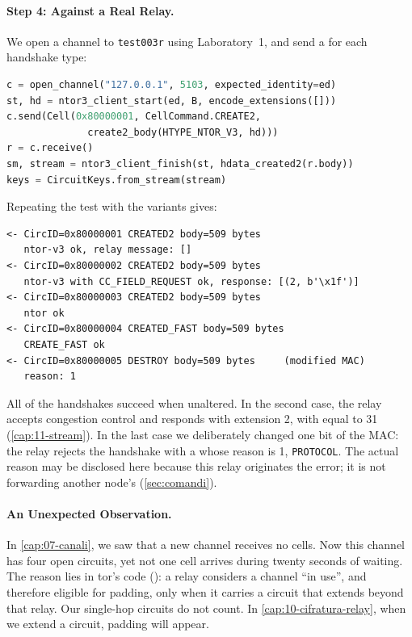 \paragraph{Step 4: Against a Real Relay.} We open a channel to \texttt{test003r} using Laboratory~1, and send a  for each handshake type:
\begin{lstlisting}[language=Python]
c = open_channel("127.0.0.1", 5103, expected_identity=ed)
st, hd = ntor3_client_start(ed, B, encode_extensions([]))
c.send(Cell(0x80000001, CellCommand.CREATE2,
              create2_body(HTYPE_NTOR_V3, hd)))
r = c.receive()
sm, stream = ntor3_client_finish(st, hdata_created2(r.body))
keys = CircuitKeys.from_stream(stream)
\end{lstlisting}
Repeating the test with the variants gives:
\begin{lstlisting}[numbers=none]
<- CircID=0x80000001 CREATED2 body=509 bytes
   ntor-v3 ok, relay message: []
<- CircID=0x80000002 CREATED2 body=509 bytes
   ntor-v3 with CC_FIELD_REQUEST ok, response: [(2, b'\x1f')]
<- CircID=0x80000003 CREATED2 body=509 bytes
   ntor ok
<- CircID=0x80000004 CREATED_FAST body=509 bytes
   CREATE_FAST ok
<- CircID=0x80000005 DESTROY body=509 bytes     (modified MAC)
   reason: 1
\end{lstlisting}
All of the handshakes succeed when unaltered. In the second case, the relay accepts congestion control and responds with extension 2, with  equal to 31 (\cref{cap:11-stream}). In the last case we deliberately changed one bit of the MAC: the relay rejects the handshake with a  whose reason is 1, \texttt{PROTOCOL}. The actual reason may be disclosed here because this relay originates the error; it is not forwarding another node's  (\cref{sec:comandi}).

\paragraph{An Unexpected Observation.} In \cref{cap:07-canali}, we saw that a new channel receives no  cells. Now this channel has four open circuits, yet not one cell arrives during twenty seconds of waiting. The reason lies in tor's code (): a relay considers a channel \enquote{in use}, and therefore eligible for padding, only when it carries a circuit that extends beyond that relay. Our single-hop circuits do not count. In \cref{cap:10-cifratura-relay}, when we extend a circuit, padding will appear.

